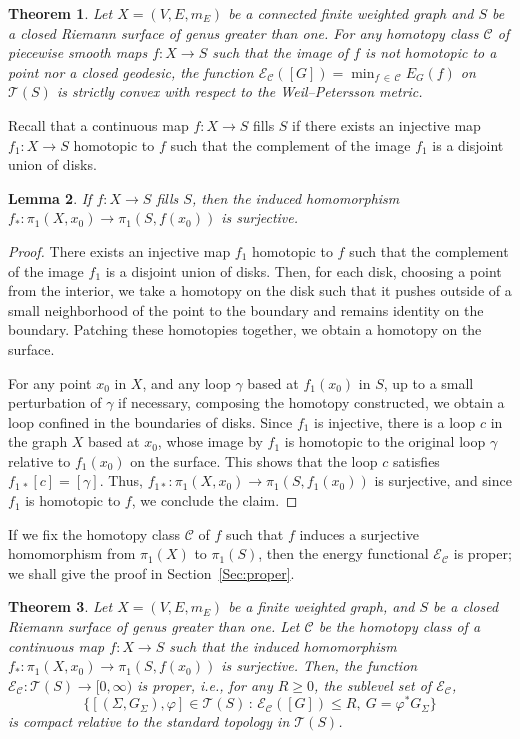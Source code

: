 \documentclass[11pt]{article}
\newtheorem{theo}{Theorem}[section]
\newtheorem{lemm}[theo]{Lemma}
\theoremstyle{definition}
\numberwithin{equation}{section}
\newcommand{\g}{\gamma}
\renewcommand{\SS}{\Sigma}
\newcommand{\f}{\varphi}
\newcommand{\Cc}{\mathcal{C}}
\newcommand{\Ec}{\mathcal{E}}
\newcommand{\Tc}{\mathcal{T}}
\begin{document}
\begin{theo}\label{Thm:convex}
Let $X=(V, E, m_E)$ be a connected finite weighted graph and $S$ be a closed Riemann surface of genus greater than one. For any homotopy class $\Cc$ of piecewise smooth maps $f: X \to S$ such that the image of $f$ is not homotopic to a point nor a closed geodesic, the function $\Ec_\Cc([G])=\min_{f \,\in\,\Cc}E_G(f)$ on $\Tc(S)$ is strictly convex with respect to the Weil--Petersson metric.
\end{theo}



Recall that a continuous map $f:X \to S$ fills $S$ if there exists an injective map $f_1:X \to S$ homotopic to $f$ such that the complement of the image $f_1$ is a disjoint union of disks.

\begin{lemm}\label{Lem:fill}
If $f:X \to S$ fills $S$, then the induced homomorphism $f_\ast: \pi_1(X, x_0) \to \pi_1(S, f(x_0))$ is surjective.
\end{lemm}

\begin{proof}
There exists an injective map $f_1$ homotopic to $f$ such that the complement of the image $f_1$ is a disjoint union of disks. Then, for each disk, choosing a point from the interior, we take a homotopy on the disk such that it pushes outside of a small neighborhood of the point to the boundary and remains identity on the boundary. Patching these homotopies together, we obtain a homotopy on the surface.

For any point $x_0$ in $X$, and any loop $\g$ based at $f_1(x_0)$ in $S$, up to a small perturbation of $\g$ if necessary, composing the homotopy constructed, we obtain a loop confined in the boundaries of disks. Since $f_1$ is injective, there is a loop $c$ in the graph $X$ based at $x_0$, whose image by $f_1$ is homotopic to the original loop $\g$ relative to $f_1(x_0)$ on the surface. This shows that the loop $c$ satisfies $f_{1\,\ast} [c]=[\g]$. Thus, $f_{1 \ast}: \pi_1(X, x_0) \to \pi_1(S, f_1(x_0))$ is surjective, and since $f_1$ is homotopic to $f$, we conclude the claim.
\end{proof}


If we fix the homotopy class $\Cc$ of $f$ such that $f$ induces a surjective homomorphism from $\pi_1(X)$ to $\pi_1(S)$, then the energy functional $\Ec_\Cc$ is proper; we shall give the proof in Section~\ref{Sec:proper}.

\begin{theo}\label{Thm:proper}
Let $X=(V, E, m_E)$ be a finite weighted graph, and $S$ be a closed Riemann surface of genus greater than one. Let $\Cc$ be the homotopy class of a continuous map $f:X \to S$ such that the induced homomorphism $f_\ast:\pi_1(X, x_0) \to \pi_1(S, f(x_0))$ is surjective. Then, the function $\Ec_\Cc:\Tc(S) \to [0, \infty)$ is proper, i.e., for any $R \ge 0$, the sublevel set of $\Ec_\Cc$,
\[
\big\{\left[(\SS, G_\SS), \f\right] \in \Tc(S) \, : \, \Ec_\Cc([G]) \le R, \ G=\f^\ast G_\SS \big\}
\]
is compact relative to the standard topology in $\Tc(S)$.
\end{theo}
\end{document}
